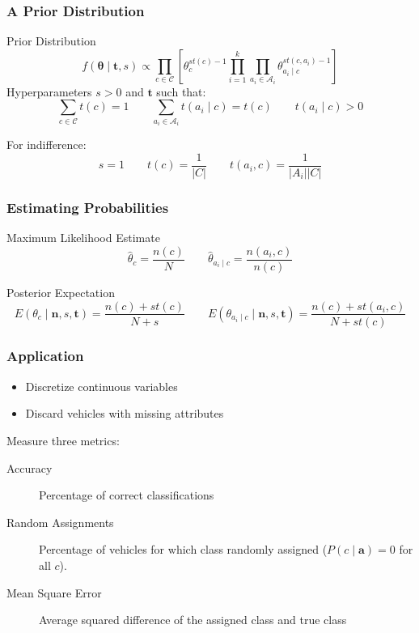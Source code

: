 \documentclass{beamer}
\begin{document}
\begin{frame}
	\frametitle{A Prior Distribution}
	\begin{block}{Prior Distribution}
		\begin{equation}
			f(\mathbf{\theta} \mid \mathbf{t}, s) \propto \prod_{c \in \mathcal{C}} \left[ \theta_c^{st(c) - 1} \prod_{i=1}^k \prod_{a_i \in \mathcal{A}_i} \theta_{a_i \mid c}^{st(c, a_i) - 1} \right]
		\end{equation}
		Hyperparameters $s>0$ and $\mathbf{t}$ such that:
		\begin{equation}
			\sum_{c \in \mathcal{C}} t(c) = 1 \qquad \sum_{a_i \in \mathcal{A}_i} t(a_i \mid c) = t(c) \qquad t(a_i \mid c) > 0
		\end{equation}
	\end{block}
	For indifference:
	\begin{equation}
		s = 1 \qquad t(c) = \frac{1}{|C|} \qquad t(a_i, c) = \frac{1}{|A_i||C|}
	\end{equation}
\end{frame}

\begin{frame}
	\frametitle{Estimating Probabilities}
	\begin{block}{Maximum Likelihood Estimate}
		\begin{equation}
			\hat{\theta}_c = \frac{n(c)}{N} \qquad \hat{\theta}_{a_i \mid c} = \frac{n(a_i, c)}{n(c)}
		\end{equation}
	\end{block}
	\begin{block}{Posterior Expectation}
		\begin{equation}
			E(\theta_c \mid \mathbf{n},s,\mathbf{t}) = \frac{n(c) + st(c)}{N + s} \qquad E(\theta_{a_i \mid c} \mid \mathbf{n},s,\mathbf{t}) = \frac{n(c) + st(a_i, c)}{N + st(c)}
		\end{equation}
	\end{block}
\end{frame}

\begin{frame}
	\frametitle{Application}
	\begin{itemize}
		\item Discretize continuous variables
		\item Discard vehicles with missing attributes
	\end{itemize}

	Measure three metrics:
	\begin{description}
		\item[Accuracy] Percentage of correct classifications
		\item[Random Assignments] Percentage of vehicles for which class randomly assigned ($P(c \mid \mathbf{a}) = 0$ for all $c$).
		\item[Mean Square Error] Average squared difference of the assigned class and true class
	\end{description}
\end{frame}
\end{document}
